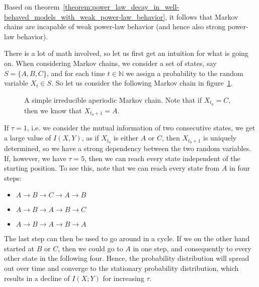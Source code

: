 \documentclass[../../main.tex]{subfiles}
\begin{document}
    \begin{remark}
        Based on theorem~\ref{theorem:power_law_decay_in_well-behaved_models_with_weak_power-law_behavior}, it follows that Markov chains are incapable of weak power-law behavior (and hence also strong power-law behavior).
    \end{remark}

    \bigskip \noindent
    There is a lot of math involved, so let us first get an intuition for what is going on. When considering Markov chains, we consider a set of states, say $S = \{A, B, C\}$, and for each time $t \in \mathbb{N}$ we assign a probability to the random variable $X_t \in S$. So let us consider the following Markov chain in figure~\ref{fig:2_markov_chain}.

    \begin{figure}[h]
    \center
    \caption{A simple irreducible aperiodic Markov chain. Note that if $X_{t_0} = C$, then we know that $X_{t_0+1} = A$.}
    \label{fig:2_markov_chain}
    \end{figure}

    \noindent
    If $\tau = 1$, i.e. we consider the mutual information of two consecutive states, we get a large value of $I(X, Y)$, as if $X_{t_0}$ is either $A$ or $C$, then $X_{t_0+1}$ is uniquely determined, so we have a strong dependency between the two random variables. If, however, we have $\tau = 5$, then we can reach every state independent of the starting position. To see this, note that we can reach every state from $A$ in four steps:
    \begin{itemize}
        \item $A \rightarrow B \rightarrow C \rightarrow A \rightarrow B$
        \item $A \rightarrow B \rightarrow A \rightarrow B \rightarrow C$
        \item $A \rightarrow B \rightarrow A \rightarrow B \rightarrow A$
    \end{itemize}
    The last step can then be used to go around in a cycle. If we on the other hand started at $B$ or $C$, then we could go to $A$ in one step, and consequently to every other state in the following four. Hence, the probability distribution will spread out over time and converge to the stationary probability distribution, which results in a decline of $I(X; Y)$ for increasing $\tau$.
    
\end{document}
